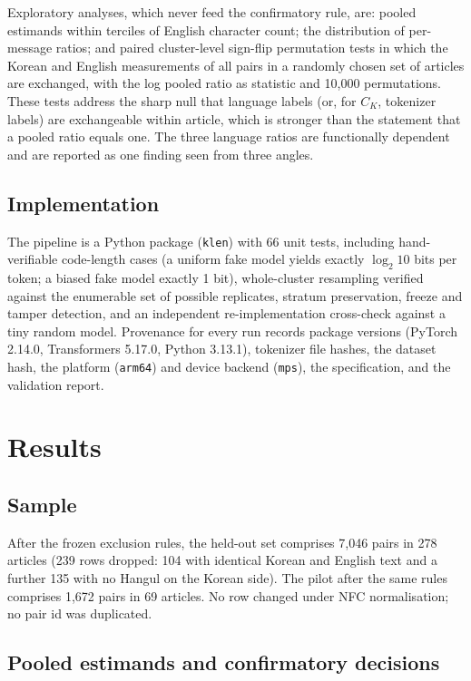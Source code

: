 \documentclass[11pt,a4paper]{article}
\newcommand{\CK}{C_{K}}
\begin{document}
Exploratory analyses, which never feed the confirmatory rule, are: pooled
estimands within terciles of English character count; the distribution of
per-message ratios; and paired cluster-level sign-flip permutation tests in
which the Korean and English measurements of all pairs in a randomly chosen
set of articles are exchanged, with the log pooled ratio as statistic and
10{,}000 permutations. These tests address the sharp null that language
labels (or, for $\CK$, tokenizer labels) are exchangeable within article,
which is stronger than the statement that a pooled ratio equals one. The
three language ratios are functionally dependent and are reported as one
finding seen from three angles.

\subsection{Implementation}

The pipeline is a Python package (\texttt{klen}) with 66 unit tests,
including hand-verifiable code-length cases (a uniform fake model yields
exactly $\log_2 10$ bits per token; a biased fake model exactly 1 bit),
whole-cluster resampling verified against the enumerable set of possible
replicates, stratum preservation, freeze and tamper detection, and an
independent re-implementation cross-check against a tiny random model.
Provenance for every run records package versions (PyTorch 2.14.0,
Transformers 5.17.0, Python 3.13.1), tokenizer file hashes, the dataset
hash, the platform (\texttt{arm64}) and device backend (\texttt{mps}), the
specification, and the validation report.

\section{Results}
\label{sec:results}

\subsection{Sample}

After the frozen exclusion rules, the held-out set comprises 7{,}046 pairs
in 278 articles (239 rows dropped: 104 with identical Korean and English
text and a further 135 with no Hangul on the Korean side). The pilot after
the same rules comprises 1{,}672 pairs in 69 articles. No row changed under
NFC normalisation; no pair id was duplicated.

\subsection{Pooled estimands and confirmatory decisions}
\end{document}
